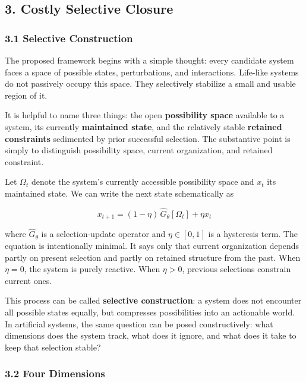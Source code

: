 \documentclass[Afour,sageh,times,doublespace]{sagej}
\begin{document}
\subsection{3. Costly Selective Closure}\label{costly-selective-closure}

\subsubsection{3.1 Selective Construction}\label{selective-construction}

The proposed framework begins with a simple thought: every candidate system faces a space of possible states, perturbations, and interactions. Life-like systems do not passively occupy this space. They selectively stabilize a small and usable region of it.

It is helpful to name three things: the open \textbf{possibility space} available to a system, its currently \textbf{maintained state}, and the relatively stable \textbf{retained constraints} sedimented by prior successful selection. The substantive point is simply to distinguish possibility space, current organization, and retained constraint.

Let \(\Omega_t\) denote the system's currently accessible possibility space and \(x_t\) its maintained state. We can write the next state schematically as

\[
x_{t+1} = (1 - \eta)\,\hat{G}_{\theta}[\Omega_t] + \eta x_t
\]

where \(\hat{G}_\theta\) is a selection-update operator and \(\eta \in [0,1]\) is a hysteresis term. The equation is intentionally minimal. It says only that current organization depends partly on present selection and partly on retained structure from the past. When \(\eta = 0\), the system is purely reactive. When \(\eta > 0\), previous selections constrain current ones.

This process can be called \textbf{selective construction}: a system does not encounter all possible states equally, but compresses possibilities into an actionable world. In artificial systems, the same question can be posed constructively: what dimensions does the system track, what does it ignore, and what does it take to keep that selection stable?

\subsubsection{3.2 Four Dimensions}\label{four-dimensions}
\end{document}
